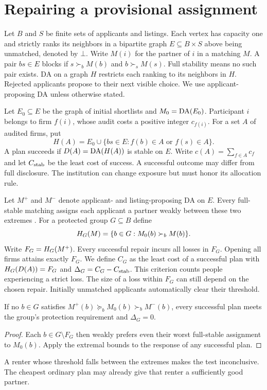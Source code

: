 \section{Repairing a provisional assignment}\label{sec:repair}
Let $B$ and $S$ be finite sets of applicants and listings. Each vertex has capacity one and strictly ranks its neighbors in a bipartite graph $E\subseteq B\times S$ above being unmatched, denoted by $\bot$. Write $M(i)$ for the partner of $i$ in a matching $M$. A pair $bs\in E$ blocks if $s\succ_b M(b)$ and $b\succ_s M(s)$. Full stability means no such pair exists. DA on a graph $H$ restricts each ranking to its neighbors in $H$. Rejected applicants propose to their next visible choice. We use applicant-proposing DA unless otherwise stated.

Let $E_0\subseteq E$ be the graph of initial shortlists and $M_0=\operatorname{DA}(E_0)$. Participant $i$ belongs to firm $f(i)$, whose audit costs a positive integer $c_{f(i)}$. For a set $A$ of audited firms, put
\[
 H(A)=E_0\cup\{bs\in E: f(b)\in A\text{ or } f(s)\in A\}.
\]
A plan succeeds if $D(A)=\operatorname{DA}(H(A))$ is stable on $E$. Write $c(A)=\sum_{f\in A} c_f$ and let $C_{\mathrm{stab}}$ be the least cost of success. A successful outcome may differ from full disclosure. The institution can change exposure but must honor its allocation rule.

Let $M^+$ and $M^-$ denote applicant- and listing-proposing DA on $E$. Every full-stable matching assigns each applicant a partner weakly between these two extremes \cite{gale1962,roth1986}. For a protected group $G\subseteq B$ define
\[
 H_G(M)=\{b\in G:M_0(b)\succ_b M(b)\}.
\]
Write $F_G=H_G(M^+)$. Every successful repair incurs all losses in $F_G$. Opening all firms attains exactly $F_G$. We define $C_G$ as the least cost of a successful plan with $H_G(D(A))=F_G$ and $\Delta_G=C_G-C_{\mathrm{stab}}$. This criterion counts people experiencing a strict loss. The size of a loss within $F_G$ can still depend on the chosen repair. Initially unmatched applicants automatically clear their threshold.

\begin{proposition}\label{prop:screen}
If no $b\in G$ satisfies $M^+(b)\succeq_b M_0(b)\succ_b M^-(b)$, every successful plan meets the group's protection requirement and $\Delta_G=0$.
\end{proposition}
\begin{proof}
Each $b\in G\setminus F_G$ then weakly prefers even their worst full-stable assignment to $M_0(b)$. Apply the extremal bounds to the response of any successful plan.
\end{proof}
A renter whose threshold falls between the extremes makes the test inconclusive. The cheapest ordinary plan may already give that renter a sufficiently good partner.

